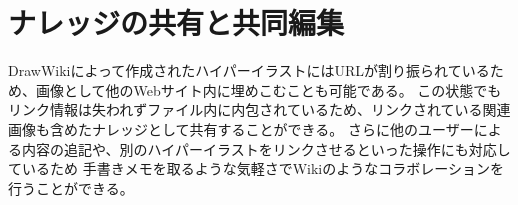 \section{ナレッジの共有と共同編集}
DrawWikiによって作成されたハイパーイラストにはURLが割り振られているため、画像として他のWebサイト内に埋めこむことも可能である。
この状態でもリンク情報は失われずファイル内に内包されているため、リンクされている関連画像も含めたナレッジとして共有することができる。
さらに他のユーザーによる内容の追記や、別のハイパーイラストをリンクさせるといった操作にも対応しているため
手書きメモを取るような気軽さでWikiのようなコラボレーションを行うことができる。

%
%

